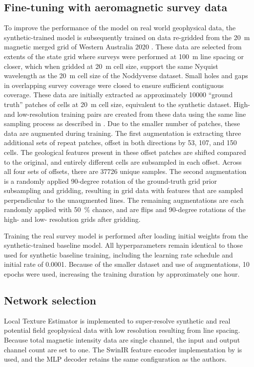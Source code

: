 \documentclass[manuscript.tex]{subfiles}
\begin{document}
\subsection{Fine-tuning with aeromagnetic survey data}
To improve the performance of the model on real world geophysical data, the synthetic-trained model is subsequently trained on data re-gridded from the \qty{20}{\m} magnetic merged grid of Western Australia 2020 \parencite{brett20MagneticMerged2020}.
These data are selected from extents of the state grid where surveys were performed at \qty{100}{\m} line spacing or closer, which when gridded at \qty{20}{\m} cell size, support the same Nyquist wavelength as the \qty{20}{\m} cell size of the Noddyverse dataset.
Small holes and gaps in overlapping survey coverage were closed to ensure sufficient contiguous coverage.
These data are initially extracted as approximately \num{10000} “ground truth” patches of  cells at \qty{20}{\m} cell size, equivalent to the synthetic dataset.
High- and low-resolution training pairs are created from these data using the same line sampling process as described in .
Due to the smaller number of patches, these data are augmented during training.
The first augmentation is extracting three additional sets of repeat patches, offset in both directions by 53, 107, and 150 cells.
The geological features present in these offset patches are shifted compared to the original, and entirely different cells are subsampled in each offset.
Across all four sets of offsets, there are \num{37726} unique samples.
The second augmentation is a randomly applied 90-degree rotation of the ground-truth grid prior subsampling and gridding, resulting in grid data with features that are sampled perpendicular to the unaugmented lines.
The remaining augmentations are each randomly applied with \qty{50}{\percent} chance, and are flips and 90-degree rotations of the high- and low- resolution grids after gridding.

Training the real survey model is performed after loading initial weights from the synthetic-trained baseline model.
All hyperparameters remain identical to those used for synthetic baseline training, including the learning rate schedule and initial rate of \num{0.0001}.
Because of the smaller dataset and use of augmentations, \num{10} epochs were used, increasing the training duration by approximately one hour.


\subsection{    Network selection }
Local Texture Estimator \parencite{leeLocalTextureEstimator2022} is implemented to super-resolve synthetic and real potential field geophysical data with low resolution resulting from line spacing.
Because total magnetic intensity data are single channel, the input and output channel count are set to one.
The SwinIR feature encoder implementation by is used, and the MLP decoder retains the same configuration as the authors.
\end{document}
